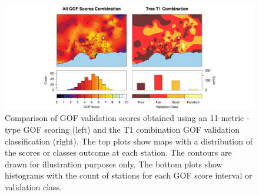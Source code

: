 \begin{figure}[th!]
	\centering
	\includegraphics[width=\textwidth]{figures/pdf/figure-11}
	\caption{Comparison of GOF validation scores obtained using an 11-metric \citet{Anderson_2004_Proc}-type GOF scoring (left) and the T1 combination GOF validation classification (right). The top plots show maps with a distribution of the scores or classes outcome at each station. The contours are drawn for illustration purposes only. The bottom plots show histograms with the count of stations for each GOF score interval or validation class.}
	\label{fig:avg-gof-maps}
\end{figure}

